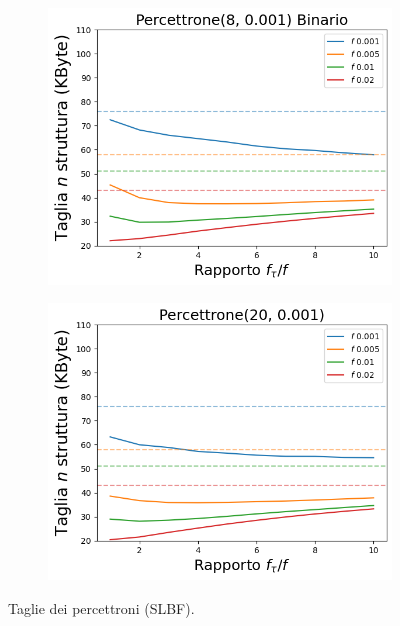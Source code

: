 \documentclass[../../main.tex]{subfiles}
\begin{document}
    \begin{figure}[H]
        \centering
        \begin{subfigure}[b]{0.48\textwidth}
            \centering
            \includegraphics[width=\textwidth]{immagini/7/SLBF/Percettrone(8, 0.001) Binario_Taglia.png}
            \caption{}
        \end{subfigure}
        \begin{subfigure}[b]{0.48\textwidth}
            \centering
            \includegraphics[width=\textwidth]{immagini/7/SLBF/Percettrone(20, 0.001)_Taglia.png}
            \caption{}  
        \end{subfigure}
        \caption{Taglie dei percettroni (SLBF).}
        \label{fig:tagliePercettroniBinSLBF}
    \end{figure}
\end{document}
